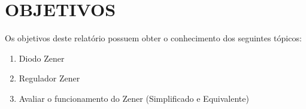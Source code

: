 \chapter{OBJETIVOS}

Os objetivos deste relatório possuem obter o conhecimento dos seguintes tópicos:

\begin{enumerate}
    \item Diodo Zener
    \item Regulador Zener
    \item Avaliar o funcionamento do Zener (Simplificado e Equivalente)
\end{enumerate}